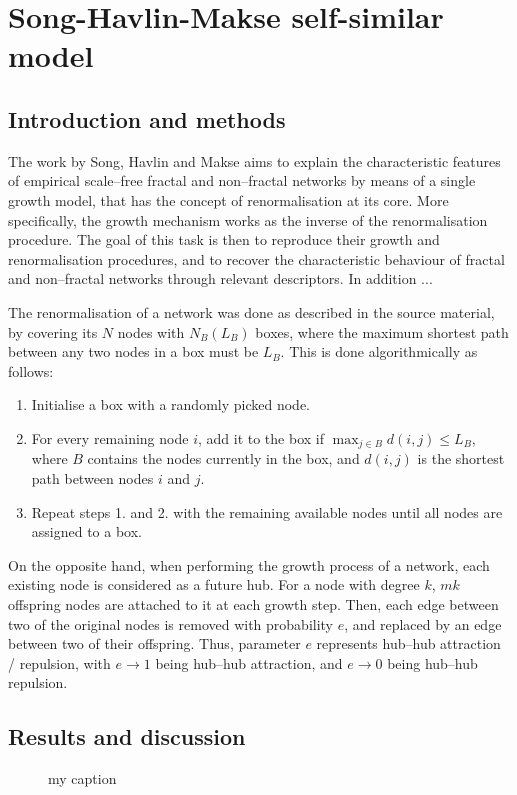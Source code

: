 \chapter{Song-Havlin-Makse self-similar model}


\section{Introduction and methods}
 
The work by Song, Havlin and Makse \cite{song2006origins} aims to explain the characteristic features of empirical scale--free fractal and non--fractal networks by means of a single growth model, that has the concept of renormalisation at its core. More specifically, the growth mechanism works as the inverse of the renormalisation procedure. The goal of this task is then to reproduce their growth and renormalisation procedures, and to recover the characteristic behaviour of fractal and non--fractal networks through relevant descriptors. In addition ...

The renormalisation of a network was done as described in the source material, by covering its $N$ nodes with $N_B(L_B)$ boxes, where the maximum shortest path between any two nodes in a box must be $L_B$. This is done algorithmically as follows:

\begin{enumerate}
	\item Initialise a box with a randomly picked node.
	\item For every remaining node $i$, add it to the box if $\max_{j\in B} d(i,j) \leq L_B$, where $B$ contains the nodes currently in the box, and $d(i,j)$ is the shortest path between nodes $i$ and $j$.
	\item Repeat steps 1. and 2. with the remaining available nodes until all nodes are assigned to a box.
\end{enumerate}

On the opposite hand, when performing the growth process of a network, each existing node is considered as a future hub. For a node with degree $k$, $mk$ offspring nodes are attached to it at each growth step. Then, each edge between two of the original nodes is removed with probability $e$, and replaced by an edge between two of their offspring. Thus, parameter $e$ represents hub--hub attraction / repulsion, with $e\rightarrow1$ being hub--hub attraction, and $e\rightarrow0$ being hub--hub repulsion.

\section{Results and discussion}


\begin{figure}
\centering     %
{}
\caption{my caption}
\end{figure}

\lipsum[2-4]


\newpage